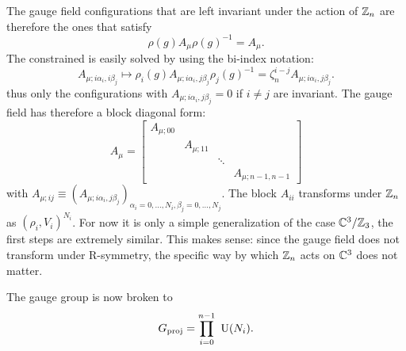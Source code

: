         The gauge field configurations that are left invariant under the action of $\mathbb{Z}_n$ are therefore the ones that satisfy
        \begin{equation}
            \rho(g)A_\mu\rho(g)^{-1}=A_\mu.
        \end{equation}
        The constrained is easily solved by using the bi-index notation:
        \begin{equation}
            A_{\mu;i\alpha_i,i\beta_j}\mapsto \rho_i(g)A_{\mu;i\alpha_i,j\beta_j}\rho_j(g)^{-1}=\zeta^{i-j}_nA_{\mu;i\alpha_i,j\beta_j}.
        \end{equation}
        thus only the configurations with $A_{\mu;i\alpha_i,j\beta_j}=0$ if $i\neq j$ are invariant. The gauge field has therefore a block diagonal form:
        \begin{equation}
            A_\mu=
            \begin{bmatrix}
                A_{\mu;00} & & & \\
                & A_{\mu;11} & & \\
                & & \ddots & \\
                & & & A_{\mu;n-1,n-1}
            \end{bmatrix}
        \end{equation}
        with $A_{\mu;ij}\equiv (A_{\mu;i\alpha_i,j\beta_j})_{\alpha_i=0,\dots,N_i,\beta_j=0,\dots,N_j}$. The block $A_{ii}$ transforms under $\mathbb{Z}_n$ as $(\rho_i,V_i)^{N_i}$. For now it is only a simple generalization of the case $\mathbb{C}^3/\mathbb{Z}_3$, the first steps are extremely similar. This makes sense: since the gauge field does not transform under R-symmetry, the specific way by which $\mathbb{Z}_n$ acts on $\mathbb{C}^3$ does not matter.
        
        The gauge group is now broken to
        \begin{equation}
            G_{\text{proj}}=\prod^{n-1}_{i=0}~\text{U}(N_i).
        \end{equation}

